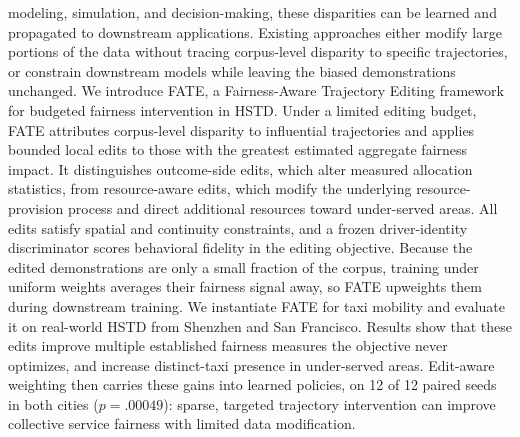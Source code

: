 modeling, simulation, and decision-making, these disparities can be learned and
propagated to downstream applications. Existing approaches either modify large
portions of the data without tracing corpus-level disparity to specific
trajectories, or constrain downstream models while leaving the biased
demonstrations unchanged. We introduce FATE, a Fairness-Aware Trajectory
Editing framework for budgeted fairness intervention in HSTD. Under a limited
editing budget, FATE attributes corpus-level disparity to influential
trajectories and applies bounded local edits to those with the greatest
estimated aggregate fairness impact. It distinguishes outcome-side edits, which
alter measured allocation statistics, from resource-aware edits, which modify
the underlying resource-provision process and direct additional resources
toward under-served areas. All edits satisfy spatial and continuity constraints, and a
frozen driver-identity discriminator scores behavioral fidelity in the editing
objective. Because the edited demonstrations are only a small fraction of the
corpus, training under uniform weights averages their fairness signal away, so
FATE upweights them during downstream training. We instantiate FATE for
taxi mobility and evaluate it on real-world HSTD from Shenzhen and San
Francisco. Results show that these edits improve multiple established fairness
measures the objective never optimizes, and increase
distinct-taxi presence in under-served areas. Edit-aware weighting then
carries these gains into learned policies, on 12 of 12 paired seeds in both
cities ($p = .00049$): sparse, targeted trajectory intervention can improve
collective service fairness with limited data modification.
